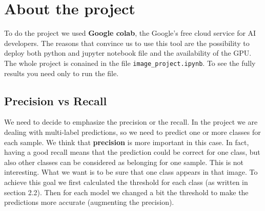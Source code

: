 \section{About the project}

To do the project we used \textbf{Google colab}, the Google's free cloud service for AI developers. The reasons that convince us to use this tool are the possibility to deploy both python and jupyter notebook file and the availability of the GPU. \\
The whole project is conained in the file \texttt{image\_project.ipynb}. To see the fully results you need only to run the file.

\subsection{Precision vs Recall}

We need to decide to emphasize the precision or the recall. In the project we are dealing with multi-label predictions, so we need to predict one or more classes for each sample. We think that \textbf{precision} is more important in this case. In fact, having a good recall means that the prediction could be correct for one class, but also other classes can be considered as belonging for one sample. This is not interesting. What we want is to be sure that one class appears in that image. To achieve this goal we first calculated the threshold for each class (as written in section 2.2). Then for each model we changed a bit the threshold to make the predictions more accurate (augmenting the precision).